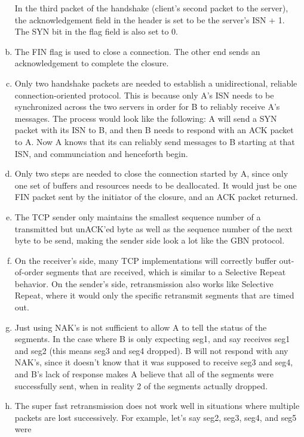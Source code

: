 \documentclass[11pt]{article}
\begin{document}
\begin{enumerate}[(a)]
      In the third packet of the handshake (client's second packet to the server),
      the acknowledgement field in the header is set to be the server's ISN + 1.
      The SYN bit in the flag field is also set to 0.
    \item
      The FIN flag is used to close a connection. The other end sends an acknowledgement
      to complete the closure.
    \item
      Only two handshake packets are needed to establish a unidirectional, reliable
      connection-oriented protocol. This is because only A's ISN needs to be
      synchronized across the two servers in order for B to reliably receive
      A's messages. The process would look like the following: A will send a SYN packet
      with its ISN to B, and then B needs to respond with an ACK packet to A. Now
      A knows that its can reliably send messages to B starting at that ISN,
      and communciation and henceforth begin.
    \item
      Only two steps are needed to close the connection started by A, since only
      one set of buffers and resources needs to be deallocated. It would just be
      one FIN packet sent by the initiator of the closure, and an ACK packet
      returned.
    \item
      The TCP sender only maintains the smallest sequence number of a transmitted
      but unACK'ed byte as well as the sequence number of the next byte to be send,
      making the sender side look a lot like the GBN protocol.
    \item
      On the receiver's side, many TCP implementations will correctly buffer
      out-of-order segments that are received, which is similar to a Selective
      Repeat behavior. On the sender's side, retransmission also works like
      Selective Repeat, where it would only the specific retransmit segments that
      are timed out.
    \item
      Just using NAK's is not sufficient to allow A to tell the status of the segments.
      In the case where B is only expecting seg1, and say receives seg1 and seg2
      (this means seg3 and seg4 dropped). B will not respond with any NAK's,
      since it doesn't know that it was supposed to receive seg3 and seg4, and B's
      lack of response makes A believe that all of the segments were successfully sent,
      when in reality 2 of the segments actually dropped.
    \item
      The super fast retransmission does not work well in situations where multiple
      packets are lost successively. For example, let's say seg2, seg3, seg4, and seg5 were

\end{enumerate}
\end{document}
